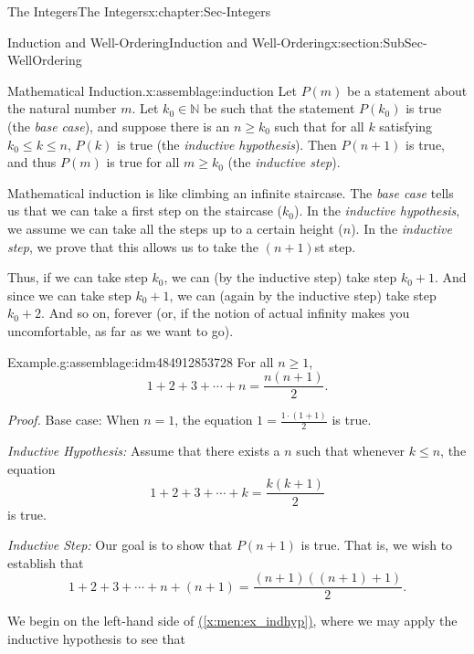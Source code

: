 \documentclass[oneside,10pt,]{book}
\newcommand{\xreffont}{\relax}
\numberwithin{equation}{section}
\renewcommand{\le}{\leqslant}
\renewcommand{\ge}{\geqslant}
\def\N{{\mathbb N}}
\begin{document}
\begin{chapterptx}{The Integers}{}{The Integers}{}{}{x:chapter:Sec-Integers}
\begin{sectionptx}{Induction and Well-Ordering}{}{Induction and Well-Ordering}{}{}{x:section:SubSec-WellOrdering}
\begin{assemblage}{Mathematical Induction.}{x:assemblage:induction}%
Let \(P(m)\) be a statement about the natural number \(m\)\footnotemark{}. Let \(k_0\in \N\) be such that the statement \(P(k_0)\) is true (the \emph{base case}), and suppose there is an \(n\ge k_0\) such that for all \(k\) satisfying \(k_0 \le k \le n\), \(P(k)\) is true (the \emph{inductive hypothesis}). Then \(P(n+1)\) is true, and thus \(P(m)\) is true for all \(m\ge k_0\) (the \emph{inductive step}).%
\end{assemblage}
%
Mathematical induction is like climbing an infinite staircase. The \emph{base case} tells us that we can take a first step on the staircase (\(k_0\)). In the \emph{inductive hypothesis}, we assume we can take all the steps up to a certain height (\(n\)). In the \emph{inductive step}, we prove that this allows us to take the \((n+1)\)st step.%
\par
Thus, if we can take step \(k_0\), we can (by the inductive step) take step \(k_0 + 1\). And since we can take step \(k_0 + 1\), we can (again by the inductive step) take step \(k_0 + 2\). And so on, forever (or, if the notion of actual infinity makes you uncomfortable, as far as we want to go).%
\begin{assemblage}{Example.}{g:assemblage:idm484912853728}%
For all \(n \ge 1\),%
\begin{equation*}
1+ 2 + 3 + \cdots + n = \frac{n(n+1)}{2}\text{.}
\end{equation*}
%
\par
\emph{Proof.} Base case: When \(n = 1\), the equation \(1 = \frac{1\cdot (1+1)}{2}\) is true.%
\par
\emph{Inductive Hypothesis:} Assume that there exists a \(n\) such that whenever \(k \le n\), the equation%
\begin{equation}
1+ 2 + 3 + \cdots + k = \frac{k(k+1)}{2}\label{x:men:ex_indhyp}
\end{equation}
is true.%
\par
\emph{Inductive Step:} Our goal is to show that \(P(n+1)\) is true. That is, we wish to establish that%
\begin{equation}
1+ 2 + 3 + \cdots + n + (n+1) = \frac{(n+1)((n+1)+1)}{2}\text{.}\label{x:men:ex_indgoal}
\end{equation}
%
\par
We begin on the left-hand side of \hyperref[x:men:ex_indhyp]{({\xreffont\ref{x:men:ex_indhyp}})}, where we may apply the inductive hypothesis to see that%

\end{assemblage}
\end{sectionptx}
\end{chapterptx}
\end{document}
